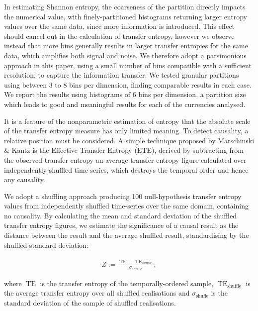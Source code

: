 \documentclass[]{rsos}%
\begin{document}
  In estimating Shannon entropy, the coarseness of the partition directly impacts the numerical value, with finely-partitioned histograms returning larger entropy values over the same data, since more information is introduced. This effect should cancel out in the calculation of transfer entropy, however we observe instead that more bins generally results in larger transfer entropies for the same data, which amplifies both signal and noise. We therefore adopt a parsimonious approach in this paper, using a small number of bins compatible with a sufficient resolution, to capture the information transfer. 
  We tested granular partitions using between 3 to 8 bins per dimension, finding comparable results in each case. We report the results using histograms of 6 bins per dimension, a partition size which leads to good and meaningful results for each of the currencies analysed.

  
  It is a feature of the nonparametric estimation of entropy that the absolute scale of the transfer entropy measure has only limited meaning. To detect causality, a relative position must be considered. A simple technique proposed by Marschinski \& Kantz \cite{Marschinski2002} is the Effective Transfer Entropy (ETE), derived by subtracting from the observed transfer entropy an average transfer entropy figure calculated over independently-shuffled time series, which destroys the temporal order and hence any causality.

  We adopt a shuffling approach producing 100 null-hypothesis transfer entropy values from independently shuffled time-series over the same domain, containing no causality. By calculating the mean and standard deviation of the shuffled transfer entropy figures, we estimate the significance of a causal result as the distance between the result and the average shuffled result, standardising by the shuffled standard deviation:
  
  \begin{eqnarray}
    \label{eq:Z-score}
    Z := \frac{\operatorname{TE} - \bar{\operatorname{TE}}_{\operatorname{shuffle}}}
              {\sigma_{\operatorname{shuffle}}} ,
  \end{eqnarray}
  
  where $\operatorname{TE}$ is the transfer entropy of the temporally-ordered sample, $\bar{\operatorname{TE}}_{\operatorname{shuffle}}$ is the average transfer entropy over all shuffled realisations and $\sigma_{\operatorname{shufle}} $ is the standard deviation of the sample of shuffled realisations.
  
\end{document}
